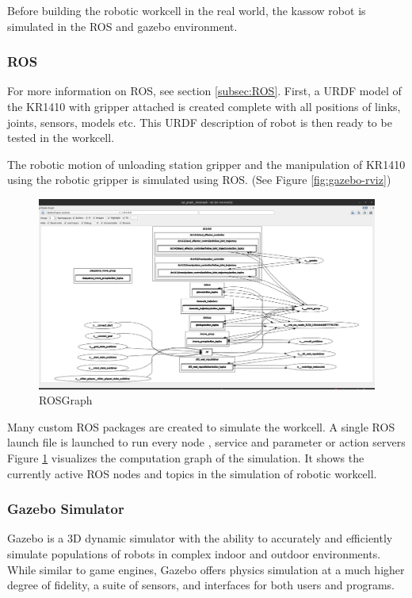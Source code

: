 Before building the robotic workcell in the real world, the kassow robot is simulated in the ROS and gazebo environment.

\subsubsection{ROS}
\label{subsubsec:ROS}
For more information on ROS, see section \ref{subsec:ROS}. First, a URDF model of the KR1410 with gripper attached is created
complete with all positions of links, joints, sensors, models etc. This URDF description of robot is then ready to be tested
in the workcell.

The robotic motion of unloading station gripper and the manipulation of KR1410 using the robotic gripper is simulated using ROS. (See Figure \ref{fig:gazebo-rviz})

\begin{figure}[h]
    \centering
    \includegraphics[width=\textwidth]{figures/rosgraph.png}
    \caption{ROSGraph}
    \label{fig:rosgraph}
\end{figure}

Many custom ROS packages \cite{rospackage} are created to simulate the workcell. A single ROS launch \cite{roslaunch} file is launched to run every node \cite{rosnode}, service \cite{rosservice} and parameter \cite{parameterserver} or action servers \cite{actionserver}
Figure \ref{fig:rosgraph} visualizes the computation graph of the simulation. It shows the currently active ROS nodes \cite{rosnode}
and topics \cite{rostopic} in the simulation of robotic workcell.



\subsubsection{Gazebo Simulator}
\label{subsubsec:gazebo}
Gazebo is a 3D dynamic simulator with the ability to accurately and efficiently simulate populations
of robots in complex indoor and outdoor environments. While similar to game engines, Gazebo
offers physics simulation at a much higher degree of fidelity, a suite of sensors, and interfaces for
both users and programs. \cite{gazebo-classic}

